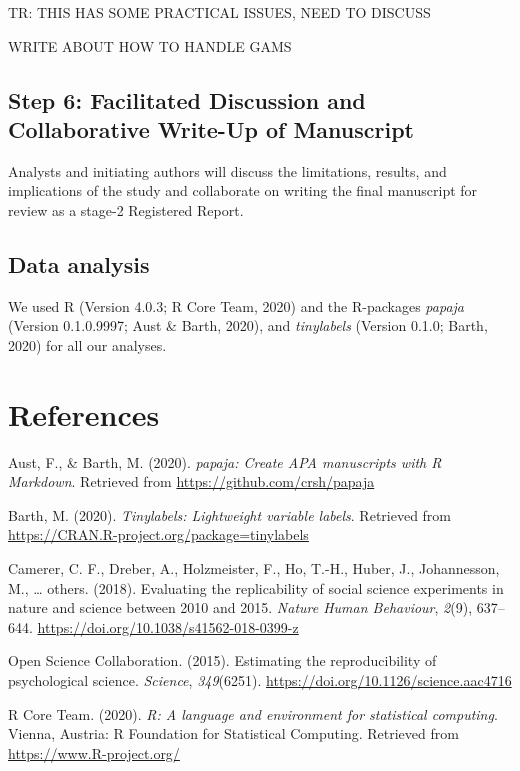 \documentclass[
  english,
  man]{apa6}
\begin{document}
TR: THIS HAS SOME PRACTICAL ISSUES, NEED TO DISCUSS

WRITE ABOUT HOW TO HANDLE GAMS

\hypertarget{step-6-facilitated-discussion-and-collaborative-write-up-of-manuscript}{%
\subsection{Step 6: Facilitated Discussion and Collaborative Write-Up of Manuscript}\label{step-6-facilitated-discussion-and-collaborative-write-up-of-manuscript}}

Analysts and initiating authors will discuss the limitations, results, and implications of the study and collaborate on writing the final manuscript for review as a stage-2 Registered Report.

\hypertarget{data-analysis}{%
\subsection{Data analysis}\label{data-analysis}}

We used R (Version 4.0.3; R Core Team, 2020) and the R-packages \emph{papaja} (Version 0.1.0.9997; Aust \& Barth, 2020), and \emph{tinylabels} (Version 0.1.0; Barth, 2020) for all our analyses.

\newpage

\hypertarget{references}{%
\section{References}\label{references}}

\begingroup
\setlength{\parindent}{-0.5in}
\setlength{\leftskip}{0.5in}

\hypertarget{refs}{}
\leavevmode\hypertarget{ref-R-papaja}{}%
Aust, F., \& Barth, M. (2020). \emph{papaja: Create APA manuscripts with R Markdown}. Retrieved from \url{https://github.com/crsh/papaja}

\leavevmode\hypertarget{ref-R-tinylabels}{}%
Barth, M. (2020). \emph{Tinylabels: Lightweight variable labels}. Retrieved from \url{https://CRAN.R-project.org/package=tinylabels}

\leavevmode\hypertarget{ref-camerer2018evaluating}{}%
Camerer, C. F., Dreber, A., Holzmeister, F., Ho, T.-H., Huber, J., Johannesson, M., \ldots{} others. (2018). Evaluating the replicability of social science experiments in nature and science between 2010 and 2015. \emph{Nature Human Behaviour}, \emph{2}(9), 637--644. \url{https://doi.org/10.1038/s41562-018-0399-z}

\leavevmode\hypertarget{ref-open2015estimating}{}%
Open Science Collaboration. (2015). Estimating the reproducibility of psychological science. \emph{Science}, \emph{349}(6251). \url{https://doi.org/10.1126/science.aac4716}

\leavevmode\hypertarget{ref-R-base}{}%
R Core Team. (2020). \emph{R: A language and environment for statistical computing}. Vienna, Austria: R Foundation for Statistical Computing. Retrieved from \url{https://www.R-project.org/}

\endgroup
\end{document}
